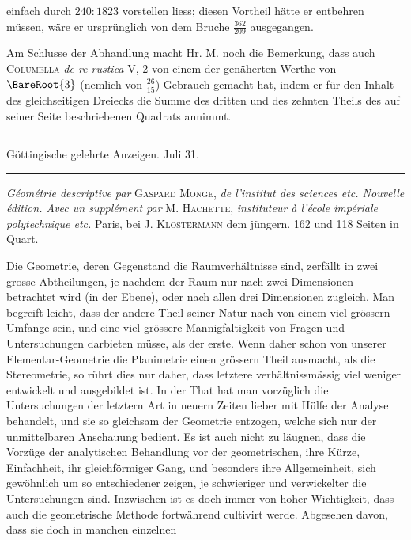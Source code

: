 %
einfach durch \(240:1823\) vorstellen liess; diesen Vortheil hätte er entbehren müssen, wäre er ursprünglich von dem Bruche \(\frac{362}{209}\) ausgegangen.

Am Schlusse der Abhandlung macht Hr. M. noch die Bemerkung, dass auch \textsc{Columella} \textit{de re rustica} V, 2 von einem der genäherten Werthe von \(\BareRoot{3}\) (nemlich von \(\frac{26}{15}\)) Gebrauch gemacht hat, indem er für den Inhalt des gleichseitigen Dreiecks die Summe des dritten und des zehnten Theils des auf seiner Seite beschriebenen Quadrats annimmt.

\begin{center}
\rule{.85\textwidth}{.3pt}\par
Göttingische gelehrte Anzeigen. Juli 31.\par
\rule{.85\textwidth}{.3pt}
\end{center}
\hspace*{\parindent}\textit{Géométrie descriptive par} \textsc{Gaspard Monge}, \textit{de l’institut des sciences etc. Nouvelle édition. Avec un supplément par} \textsc{M. Hachette}, \textit{instituteur à l’école impériale polytechnique etc.} Paris, bei \textsc{J. Klostermann} dem jüngern. 162 und 118 Seiten in Quart.

Die Geometrie, deren Gegenstand die Raumverhältnisse sind, zerfällt in zwei grosse Abtheilungen, je nachdem der Raum nur nach zwei Dimensionen betrachtet wird (in der Ebene), oder nach allen drei Dimensionen zugleich. Man begreift leicht, dass der andere Theil seiner Natur nach von einem viel grössern Umfange sein, und eine viel grössere Mannigfaltigkeit von Fragen und Untersuchungen darbieten müsse, als der erste. Wenn daher schon von unserer Elementar-Geometrie die Planimetrie einen grössern Theil ausmacht, als die Stereometrie, so rührt dies nur daher, dass letztere verhältnissmässig viel weniger entwickelt und ausgebildet ist. In der That hat man vorzüglich die Untersuchungen der letztern Art in neuern Zeiten lieber mit Hülfe der Analyse behandelt, und sie so gleichsam der Geometrie entzogen, welche sich nur der unmittelbaren Anschauung bedient. Es ist auch nicht zu läugnen, dass die Vorzüge der analytischen Behandlung vor der geometrischen, ihre Kürze, Einfachheit, ihr gleichförmiger Gang, und besonders ihre Allgemeinheit, sich gewöhnlich um so entschiedener zeigen, je schwieriger und verwickelter die Untersuchungen sind. Inzwischen ist es doch immer von hoher Wichtigkeit, dass auch die geometrische Methode fortwährend cultivirt werde. Abgesehen davon, dass sie doch in manchen einzelnen
